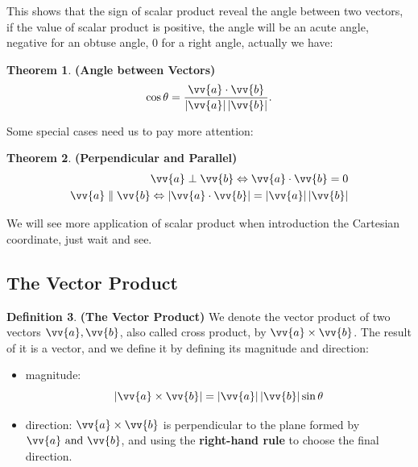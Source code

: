\documentclass[12pt, a4paper, reqno]{amsart}
\theoremstyle{definition}
\newtheorem{theorem}{Theorem}[subsection] %
\newtheorem{definition}[theorem]{Definition} %
\numberwithin{equation}{section} %
\begin{document}
This shows that the sign of scalar product reveal the angle between two vectors, if the value of scalar product is positive, the angle will be an acute angle, negative for an obtuse angle, 0 for a right angle, actually we have:
\begin{theorem}\label{T:ABV} \textbf{(Angle between Vectors)}
	\begin{equation}
		\cos \theta = \frac{\vv{a}\cdot \vv{b}}{\left|\vv{a}\right|\left|\vv{b}\right|}.
	\end{equation}
\end{theorem}
Some special cases need us to pay more attention:
\begin{theorem}\label{T:PaPoV} \textbf{(Perpendicular and Parallel)}
	\begin{align}
		\vv{a} \perp \vv{b} \Leftrightarrow \vv{a}\cdot \vv{b} = 0\\
		\vv{a} \parallel \vv{b} \Leftrightarrow \left|\vv{a}\cdot \vv{b}\right| = \left|\vv{a}\right|\left|\vv{b}\right|
	\end{align}
\end{theorem}



We will see more application of scalar product when introduction the Cartesian coordinate, just wait and see.

\subsection{The Vector Product}\label{SS:TVP}

\begin{definition}\label{D:TVP} \textbf{(The Vector Product)}
	We denote the vector product of two vectors $\vv{a}, \vv{b}$, also called cross product, by $\vv{a}\times \vv{b}$. The result of it is a vector, and we define it by defining its magnitude and direction:
	\begin{itemize}
		\item magnitude:
		\begin{equation}\label{E:TVP}
			\left|\vv{a}\times \vv{b}\right| = \left|\vv{a}\right|\left|\vv{b}\right|\sin \theta
		\end{equation}
		\item direction: $\vv{a}\times \vv{b}$ is perpendicular to the plane formed by $\vv{a}\text{ and }\vv{b}$, and using the \textbf{right-hand rule} to choose the final direction.
	\end{itemize}
\end{definition}
\end{document}
